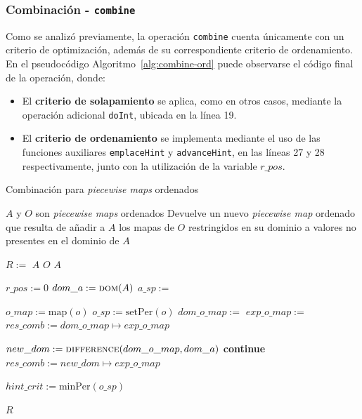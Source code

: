 \subsubsection{Combinación - \texttt{combine}}

Como se analizó previamente, la operación \texttt{combine} cuenta únicamente con un criterio de optimización, además de su correspondiente criterio de ordenamiento. En el pseudocódigo Algoritmo~\ref{alg:combine-ord} puede observarse el código final de la operación, donde:

\begin{itemize}
    \item El \textbf{criterio de solapamiento} se aplica, como en otros casos, mediante la operación adicional \texttt{doInt}, ubicada en la línea 19.
    \item El \textbf{criterio de ordenamiento} se implementa mediante el uso de las funciones auxiliares \texttt{emplaceHint} y \texttt{advanceHint}, en las líneas 27 y 28 respectivamente, junto con la utilización de la variable $r\_pos$.
\end{itemize}


\begin{algorithm}
\caption{Combinación para \textit{piecewise maps} ordenados}
\label{alg:combine-ord}
\begin{algorithmic}[1]
\Require $A$ y $O$ son \textit{piecewise maps} ordenados
\Ensure Devuelve un nuevo \textit{piecewise map} ordenado que resulta de añadir a $A$ los mapas de $O$ restringidos en su dominio a valores no presentes en el dominio de $A$

    \State $R :=$ $A$            
        \State \Return $O$
    \EndIf
        \State \Return $A$
    \EndIf

    \State $r\_pos := 0$
    \State $dom\_a := \Call{dom}{A}$
    \State $a\_sp :=$ 

        \State $o\_map := \mathrm{map}(o)$
        \State $o\_sp := \mathrm{setPer}(o)$
        \State $dom\_o\_map :=$ 
        \State $exp\_o\_map :=$ 
        \State $res\_comb := dom\_o\_map \mapsto exp\_o\_map$

            \State $new\_dom := \Call{difference}{dom\_o\_map,dom\_a}$
                \State \textbf{continue}
            \EndIf
            \State $res\_comb := new\_dom \mapsto exp\_o\_map$ 
        \EndIf

        \State $hint\_crit := \mathrm{minPer}(o\_sp)$
        \State {}
        \State {}
    \EndFor

    \State \Return $R$
\EndFunction
\end{algorithmic}
\end{algorithm}


